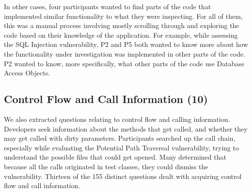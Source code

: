 \documentclass[conference]{IEEEtran}
\begin{document}
In other cases, four participants wanted to find parts of the code that implemented similar functionality to what they were inspecting.
For all of them, this was a manual process involving mostly scrolling through and exploring the code based on their knowledge of the application.
For example, while assessing the SQL Injection vulnerability, P2 and P5 both wanted to know more about how the functionality under investigation was implemented in other parts of the code. 
P2 wanted to know, more specifically, what other parts of the code use Database Access Objects.
\\






\noindent\subsection{\textbf{Control Flow and Call Information (10)}}\label{cf}
We also extracted questions relating to control flow and calling information. 
Developers seek information about the methods that get called, and whether they may get called with dirty parameters.
Participants searched up the call chain, especially while evaluating the Potential Path Traversal vulnerability, trying to understand the possible files that could get opened. 
Many determined that because all the calls originated in test classes, they could dismiss the vulnerability.
Thirteen of the 155 distinct questions dealt with acquiring control flow and call information.
\\
\end{document}
